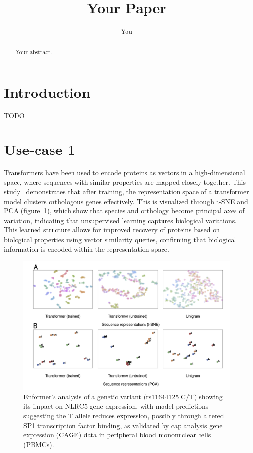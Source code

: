 \documentclass{article}
\title{Your Paper}
\author{You}
\begin{document}
\maketitle

\begin{abstract}
Your abstract.
\end{abstract}

\section{Introduction}

TODO


\section{Use-case 1}


Transformers have been used to encode proteins as vectors in a high-dimensional space, where sequences with similar properties are mapped closely together. This study~\cite{rives_biological_2021} demonstrates that after training, the representation space of a transformer model clusters orthologous genes effectively. This is visualized through t-SNE and PCA (figure~\ref{fig:gene-tsne}), which show that species and orthology become principal axes of variation, indicating that unsupervised learning captures biological variations. This learned structure allows for improved recovery of proteins based on biological properties using vector similarity queries, confirming that biological information is encoded within the representation space.
\begin{figure}[ht]
    \centering
    \includegraphics[width=0.8\linewidth]{img/gene-tsne.png}
    \caption{Enformer's analysis of a genetic variant (rs11644125 C/T) showing its impact on NLRC5 gene expression, with model predictions suggesting the T allele reduces expression, possibly through altered SP1 transcription factor binding, as validated by cap analysis gene expression (CAGE) data in peripheral blood mononuclear cells (PBMCs).}\label{fig:gene-tsne}
\end{figure}
    
\end{document}
